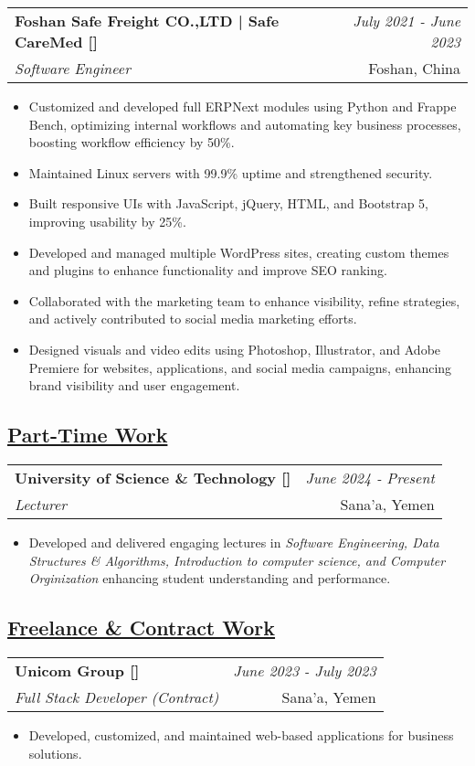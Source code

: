 \documentclass[a4paper,11pt]{article}
\makeatletter
\newcommand{\resumeSubheading}[4]{
	\vspace{0.5mm}\item
	\begin{tabular*}{0.98\textwidth}[t]{l@{\extracolsep{\fill}}r}
		\textbf{#1} & \textit{\footnotesize{#4}} \\
		\textit{\footnotesize{#3}} &  \footnotesize{#2}\\
	\end{tabular*}
	\vspace{-1.0mm}
}
\newcommand{\resumeItemListStart}{\begin{itemize}[leftmargin=*,labelsep=1mm,itemsep=0.5mm]}
\newcommand{\resumeItemListEnd}{\end{itemize}\vspace{-2mm}}
\makeatother
\begin{document}
	\resumeSubheading
	{Foshan Safe Freight CO.,LTD | Safe CareMed [\href{https://www.safecaremd.com/}{\faIcon{globe}}]}{Foshan, China}
	{Software Engineer}{July 2021 - June 2023}
	\resumeItemListStart
	\item Customized and developed full ERPNext modules using Python and Frappe Bench, optimizing internal workflows and automating key business processes, boosting workflow efficiency by 50\%.
	\item Maintained Linux servers with 99.9\% uptime and strengthened security.
	\item Built responsive UIs with JavaScript, jQuery, HTML, and Bootstrap 5, improving usability by 25\%.
	\item Developed and managed multiple WordPress sites, creating custom themes and plugins to enhance functionality and improve SEO ranking.
	\item Collaborated with the marketing team to enhance visibility, refine strategies, and actively contributed to social media marketing efforts.
	\item Designed visuals and video edits using Photoshop, Illustrator, and Adobe Premiere for websites, applications, and social media campaigns, enhancing brand visibility and user engagement.
	\resumeItemListEnd
	
	\vspace{-3mm}
	\subsection*{\underline{Part-Time Work}}
	\vspace{-3mm}

	\resumeSubheading
	{{University of Science \& Technology [\href{https://ust.edu.ye/cit/}{\faIcon{globe}}]}}{Sana'a, Yemen}
	{Lecturer}{June 2024 - Present}
	\resumeItemListStart
    \item Developed and delivered engaging lectures in \emph{Software Engineering, Data Structures \& Algorithms, Introduction to computer science, and Computer Orginization} enhancing student understanding and performance.
	\resumeItemListEnd

	\vspace{-3mm}
	\subsection*{\underline{Freelance \& Contract Work}}
	\vspace{-3mm}

	\resumeSubheading
	{{Unicom Group [\href{https://www.unicomg.com}{\faIcon{globe}}]}}{Sana'a, Yemen}
	{Full Stack Developer (Contract)}{June 2023 - July 2023}
	\resumeItemListStart
	\item Developed, customized, and maintained web-based applications for business solutions.
	\resumeItemListEnd
\end{document}
